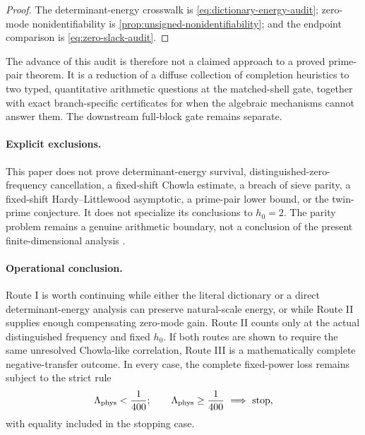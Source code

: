 \begin{proof}
The determinant-energy crosswalk is
\eqref{eq:dictionary-energy-audit}; zero-mode nonidentifiability is
\cref{prop:unsigned-nonidentifiability}; and the endpoint comparison
is \eqref{eq:zero-slack-audit}.
\end{proof}

The advance of this audit is therefore not a claimed approach to a
proved prime-pair theorem.  It is a reduction of a diffuse collection
of completion heuristics to two typed, quantitative arithmetic
questions at the matched-shell gate, together with exact
branch-specific certificates for when the algebraic mechanisms cannot
answer them.  The downstream full-block gate remains separate.

\paragraph{Explicit exclusions.}
This paper does not prove determinant-energy survival,
distinguished-zero-frequency cancellation, a fixed-shift Chowla
estimate, a breach of sieve parity, a fixed-shift
Hardy--Littlewood asymptotic, a prime-pair lower bound, or the
twin-prime conjecture.  It does not specialize its conclusions to
\(h_0=2\).  The parity problem remains a genuine arithmetic boundary,
not a conclusion of the present finite-dimensional analysis
\citep{HeathBrown1982Parity,IwaniecKowalski2004}.

\paragraph{Operational conclusion.}
Route I is worth continuing while either the literal dictionary or a
direct determinant-energy analysis can preserve natural-scale energy,
or while Route II supplies enough compensating zero-mode gain.  Route
II counts only at the actual
distinguished frequency and fixed \(h_0\).  If both routes are shown
to require the same unresolved Chowla-like correlation, Route III is
a mathematically complete negative-transfer outcome.  In every
case, the complete fixed-power loss remains subject to the strict
rule
\[
 \Lambda_{\rm phys}<\frac1{400};
 \qquad
 \Lambda_{\rm phys}\ge\frac1{400}
 \ \Longrightarrow\ \text{stop},
\]
with equality included in the stopping case.
